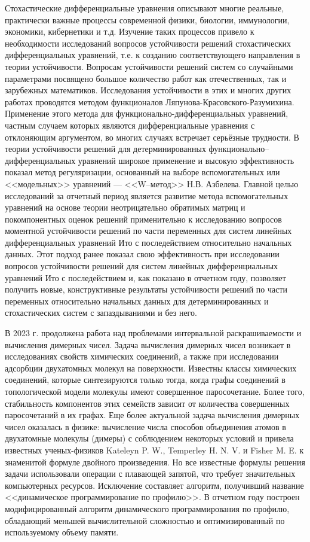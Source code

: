 Стохастические дифференциальные уравнения описывают многие реальные, практически важные процессы современной физики, биологии, иммунологии, экономики, кибернетики и т.д. Изучение таких процессов привело к необходимости исследований вопросов устойчивости решений стохастических дифференциальных
уравнений, т.е. к созданию соответствующего направления в теории устойчивости. 
Вопросам устойчивости решений систем со случайными параметрами посвящено большое количество работ как отечественных, так и
зарубежных математиков. Исследования устойчивости в этих и многих других
работах проводятся методом функционалов Ляпунова-Красовского-Разумихина. Применение этого метода для функционально-дифференциальных уравнений, частным случаем которых являются дифференциальные уравнения с отклоняющим аргументом, во многих случаях встречает серьёзные трудности. В теории устойчивости решений для детерминированных функционально--дифференциальных
уравнений широкое применение и высокую эффективность показал метод регуляризации, основанный на выборе вспомогательных или <<модельных>> уравнений  --- <<W--метод>> Н.В. Азбелева.
Главной целью исследований за отчетный период является развитие метода вспомогательных уравнений на основе теории
неотрицательно обратимых матриц и покомпонентных оценок решений применительно к исследованию вопросов моментной устойчивости решений
по части переменных для систем линейных дифференциальных уравнений Ито с последействием относительно начальных данных. Этот подход
ранее показал свою эффективность при исследовании вопросов устойчивости решений для систем линейных дифференциальных уравнений
Ито с последействием и, как показано в отчетном году, позволяет получить новые, конструктивные результаты устойчивости решений по
части переменных относительно начальных данных для детерминированных и стохастических систем с запаздываниями и без него.

В 2023 г. продолжена работа над проблемами интервальной раскрашиваемости и вычисления димерных чисел.
Задача вычисления димерных чисел возникает в исследованиях свойств химических соединений, а также при исследовании адсорбции двухатомных молекул на поверхности.
Известны классы химических соединений, которые синтезируются только тогда, когда графы соединений в топологической модели молекулы имеют совершенное паросочетание. Более того, стабильность компонентов этих семейств зависит от количества совершенных паросочетаний в их графах.
Еще более актуальной задача вычисления димерных чисел оказалась в физике: вычисление числа способов объединения атомов в двухатомные молекулы (димеры) с соблюдением некоторых условий и привела известных ученых-физиков Kateleyn P. W., Temperley H. N. V. и Fisher M. E. к знаменитой формуле двойного произведения. Но все известные формулы решения задачи использовали операции с плавающей запятой, что требует значительных компьютерных ресурсов.
Исключение составляет алгоритм, получивший название <<динамическое программирование по профилю>>. В отчетном году построен модифицированный алгоритм динамического программирования по профилю, обладающий меньшей вычислительной сложностью и оптимизированный по используемому объему памяти.


